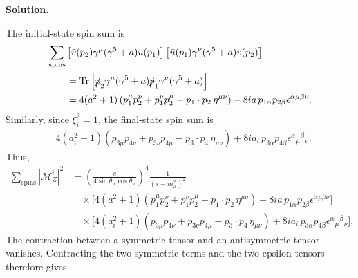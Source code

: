 \documentclass[a4paper,11pt]{article}
\DeclareMathOperator{\Tr}{Tr}
\newenvironment{solution}{\par\medskip\noindent\textbf{Solution.}\par\smallskip}{\par\medskip}
\begin{document}
\begin{solution}
The initial-state spin sum is
\begin{equation}
\begin{aligned}
    &\sum_{\mathrm{spins}}
    \left[
        \bar v(p_2)\gamma^\mu(\gamma^5+a)u(p_1)
    \right]
    \left[
        \bar u(p_1)\gamma^\nu(\gamma^5+a)v(p_2)
    \right]
    \\
    &\qquad =
    \Tr\left[
        \slashed{p}_2\gamma^\mu(\gamma^5+a)
        \slashed{p}_1\gamma^\nu(\gamma^5+a)
    \right]
    \\
    &\qquad =
    4(a^2+1)
    \left(
        p_1^\mu p_2^\nu
        +p_1^\nu p_2^\mu
        -p_1\cdot p_2\,\eta^{\mu\nu}
    \right)
    -8ia\,p_{1\alpha}p_{2\beta}
    \epsilon^{\alpha\mu\beta\nu}.
\end{aligned}
\end{equation}
Similarly, since $\xi_i^2=1$, the final-state spin sum is
\begin{equation}
\begin{aligned}
    &4(a_i^2+1)
    \left(
        p_{3\mu}p_{4\nu}
        +p_{3\nu}p_{4\mu}
        -p_3\cdot p_4\,\eta_{\mu\nu}
    \right)
    +8ia_i\,p_{3\alpha}p_{4\beta}
    \epsilon^{\alpha}{}_{\mu}{}^{\beta}{}_{\nu}.
\end{aligned}
\end{equation}
Thus,
\begin{equation}
\begin{aligned}
    \sum_{\mathrm{spins}}|\mathcal{M}_Z^i|^2
    &=
    \left(
        \frac{e}{4\sin\theta_w\cos\theta_w}
    \right)^4
    \frac{1}{(s-m_Z^2)^2}
    \\
    &\quad\times
    \Big[
        4(a^2+1)
        \left(
            p_1^\mu p_2^\nu
            +p_1^\nu p_2^\mu
            -p_1\cdot p_2\,\eta^{\mu\nu}
        \right)
        -8ia\,p_{1\alpha}p_{2\beta}
        \epsilon^{\alpha\mu\beta\nu}
    \Big]
    \\
    &\quad\times
    \Big[
        4(a_i^2+1)
        \left(
            p_{3\mu}p_{4\nu}
            +p_{3\nu}p_{4\mu}
            -p_3\cdot p_4\,\eta_{\mu\nu}
        \right)
        +8ia_i\,p_{3\alpha}p_{4\beta}
        \epsilon^{\alpha}{}_{\mu}{}^{\beta}{}_{\nu}
    \Big].
\end{aligned}
\end{equation}
The contraction between a symmetric tensor and an antisymmetric tensor
vanishes. Contracting the two symmetric terms and the two epsilon tensors
therefore gives
\begin{equation}
\begin{aligned}

\end{aligned}
\end{equation}
\end{solution}
\end{document}
